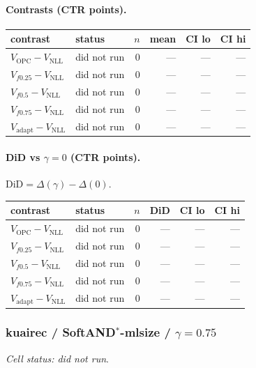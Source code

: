 \documentclass[10pt,a4paper]{article}
\begin{document}
\paragraph{Contrasts (CTR points).}
{\centering\small\begin{tabular}{llrrrr}
\toprule contrast & status & $n$ & mean & CI lo & CI hi \\
\midrule
$V_{\mathrm{OPC}}-V_{\mathrm{NLL}}$ & did not run & 0 & --- & --- & --- \\
$V_{f0.25}-V_{\mathrm{NLL}}$ & did not run & 0 & --- & --- & --- \\
$V_{f0.5}-V_{\mathrm{NLL}}$ & did not run & 0 & --- & --- & --- \\
$V_{f0.75}-V_{\mathrm{NLL}}$ & did not run & 0 & --- & --- & --- \\
$V_{\mathrm{adapt}}-V_{\mathrm{NLL}}$ & did not run & 0 & --- & --- & --- \\
\bottomrule\end{tabular}\par}
\paragraph{DiD vs $\gamma=0$ (CTR points).} $\mathrm{DiD}=\Delta(\gamma)-\Delta(0)$.
{\centering\small\begin{tabular}{llrrrr}
\toprule contrast & status & $n$ & DiD & CI lo & CI hi \\
\midrule
$V_{\mathrm{OPC}}-V_{\mathrm{NLL}}$ & did not run & 0 & --- & --- & --- \\
$V_{f0.25}-V_{\mathrm{NLL}}$ & did not run & 0 & --- & --- & --- \\
$V_{f0.5}-V_{\mathrm{NLL}}$ & did not run & 0 & --- & --- & --- \\
$V_{f0.75}-V_{\mathrm{NLL}}$ & did not run & 0 & --- & --- & --- \\
$V_{\mathrm{adapt}}-V_{\mathrm{NLL}}$ & did not run & 0 & --- & --- & --- \\
\bottomrule\end{tabular}\par}
\bigskip
\subsubsection{kuairec / SoftAND$^*$-mlsize / $\gamma=0.75$}
\emph{Cell status: did not run}.
\end{document}
